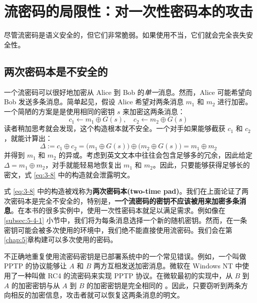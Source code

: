 \section{流密码的局限性：对一次性密码本的攻击}\label{sec:3-3}

尽管流密码是语义安全的，但它们非常脆弱。如果使用不当，它们就会完全丧失安全性。

\subsection{两次密码本是不安全的}\label{subsec:3-3-1}

一个流密码可以很好地加密从 Alice 到 Bob 的\emph{单一}消息。然而，Alice 可能希望向 Bob 发送多条消息。简单起见，假设 Alice 希望对两条消息 $m_1$ 和 $m_2$ 进行加密。一个简陋的方案是是使用相同的密钥 $s$ 来加密这两条消息：
\begin{equation}\label{eq:3-8}
c_1\leftarrow m_1\oplus G(s),\quad
c_2\leftarrow m_2\oplus G(s)
\end{equation}
读者稍加思考就会发现，这个构造根本就不安全。一个对手如果能够截获 $c_1$ 和 $c_2$，就能计算出：
\[
\Delta
:=c_1\oplus c_2
=\big(m_1\oplus G(s)\big)\oplus\big(m_2\oplus G(s)\big)
=m_1\oplus m_2
\]
并得到 $m_1$ 和 $m_2$ 的异或。考虑到英文文本中往往会包含足够多的冗余，因此给定 $\Delta=m_1\oplus m_2$，对手就能轻易地恢复出 $m_1$ 和 $m_2$。因此，只要能够获得足够长的密文，式 \ref{eq:3-8} 中的构造就会泄露明文。

式 \ref{eq:3-8} 中的构造被戏称为\textbf{两次密码本(two-time pad)}。我们在上面论证了两次密码本是完全不安全的，特别是，\textbf{一个流密码的密钥不应该被用来加密多条消息}。在本书的很多实例中，使用一次性密码本就足以满足需求。例如像在 \ref{subsec:5-4-1} 小节中，我们将为每条消息选择一个新的随机密钥。然而，在一条密钥可能会被多次使用的环境中，我们绝不能直接使用流密码。我们会在第\ref{chap:5}章构建可以多次使用的密码。

不正确地重复使用流密码密钥是已部署系统中的一个常见错误。例如，一个叫做 PPTP 的协议能够让 $A$ 和 $B$ 两方互相发送加密消息。微软在 Windows NT 中使用了一种叫做 RC4 的流密码来实现 PPTP 协议。在微软最初的实现中，从 $B$ 到 $A$ 的加密密钥与从 $A$ 到 $B$ 的加密密钥是完全相同的 \cite{schneier1998cryptanalysis}。因此，只要窃听到两条方向相反的加密信息，攻击者就可以恢复这两条消息的明文。

